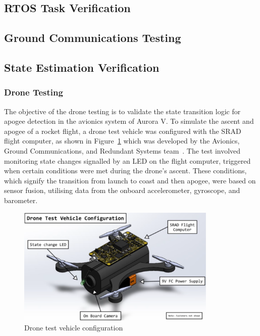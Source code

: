 \subsection{RTOS Task Verification}
\subsection{Ground Communications Testing}
\subsection{State Estimation Verification}
\subsubsection{Drone Testing}
The objective of the drone testing is to validate the state transition logic for apogee detection in the avionics system of Aurora V. To simulate the ascent and apogee of a rocket flight, a drone test vehicle was configured with the SRAD flight computer, as shown in Figure~\ref{fig:drone} which was developed by the Avionics, Ground Communications, and Redundant Systems team~\cite{avionics}. The test involved monitoring state changes signalled by an LED on the flight computer, triggered when certain conditions were met during the drone's ascent. These conditions, which signify the transition from launch to coast and then apogee, were based on sensor fusion, utilising data from the onboard accelerometer, gyroscope, and barometer.

\begin{figure}[h]
    \begin{center}
        \includegraphics[width=0.85\textwidth]{./img/drone.png}
    \end{center}
    \caption{Drone test vehicle configuration}\label{fig:drone}
\end{figure}

